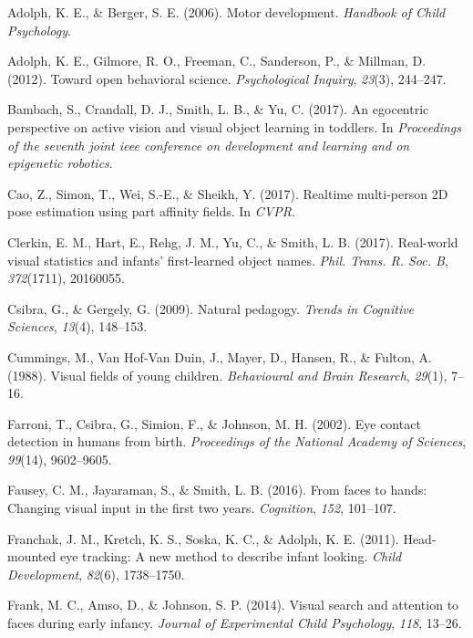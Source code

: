 \documentclass[10pt, letterpaper]{article}
\begin{document}
\setlength{\parindent}{-0.1in} \setlength{\leftskip}{0.125in} \noindent

\hypertarget{refs}{}
\hypertarget{ref-adolph2006motor}{}
Adolph, K. E., \& Berger, S. E. (2006). Motor development.
\emph{Handbook of Child Psychology}.

\hypertarget{ref-adolph2012toward}{}
Adolph, K. E., Gilmore, R. O., Freeman, C., Sanderson, P., \& Millman,
D. (2012). Toward open behavioral science. \emph{Psychological Inquiry},
\emph{23}(3), 244--247.

\hypertarget{ref-bambach2017}{}
Bambach, S., Crandall, D. J., Smith, L. B., \& Yu, C. (2017). An
egocentric perspective on active vision and visual object learning in
toddlers. In \emph{Proceedings of the seventh joint ieee conference on
development and learning and on epigenetic robotics}.

\hypertarget{ref-cao2017realtime}{}
Cao, Z., Simon, T., Wei, S.-E., \& Sheikh, Y. (2017). Realtime
multi-person 2D pose estimation using part affinity fields. In
\emph{CVPR}.

\hypertarget{ref-clerkin2017}{}
Clerkin, E. M., Hart, E., Rehg, J. M., Yu, C., \& Smith, L. B. (2017).
Real-world visual statistics and infants' first-learned object names.
\emph{Phil. Trans. R. Soc. B}, \emph{372}(1711), 20160055.

\hypertarget{ref-csibra2009natural}{}
Csibra, G., \& Gergely, G. (2009). Natural pedagogy. \emph{Trends in
Cognitive Sciences}, \emph{13}(4), 148--153.

\hypertarget{ref-cummings1988}{}
Cummings, M., Van Hof-Van Duin, J., Mayer, D., Hansen, R., \& Fulton, A.
(1988). Visual fields of young children. \emph{Behavioural and Brain
Research}, \emph{29}(1), 7--16.

\hypertarget{ref-farroni2002eye}{}
Farroni, T., Csibra, G., Simion, F., \& Johnson, M. H. (2002). Eye
contact detection in humans from birth. \emph{Proceedings of the
National Academy of Sciences}, \emph{99}(14), 9602--9605.

\hypertarget{ref-fausey2016}{}
Fausey, C. M., Jayaraman, S., \& Smith, L. B. (2016). From faces to
hands: Changing visual input in the first two years. \emph{Cognition},
\emph{152}, 101--107.

\hypertarget{ref-franchak2011}{}
Franchak, J. M., Kretch, K. S., Soska, K. C., \& Adolph, K. E. (2011).
Head-mounted eye tracking: A new method to describe infant looking.
\emph{Child Development}, \emph{82}(6), 1738--1750.

\hypertarget{ref-frank2014visual}{}
Frank, M. C., Amso, D., \& Johnson, S. P. (2014). Visual search and
attention to faces during early infancy. \emph{Journal of Experimental
Child Psychology}, \emph{118}, 13--26.
\end{document}
